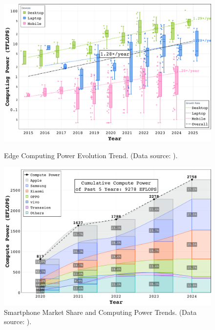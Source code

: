 \begin{figure}[htbp]
    \centering
    \begin{minipage}[t]{0.49\linewidth}
        \centering
        \includegraphics[width=\linewidth]{./figs/edge_compute_trend.pdf}
        \vspace{-20pt}
        \caption{Edge Computing Power Evolution Trend. (Data source: \cite{nanoreview2025}).}
        \label{fig:edge_trend}
    \end{minipage}
    \hfill
    \begin{minipage}[t]{0.49\linewidth}
        \centering
        \includegraphics[width=\linewidth]{./figs/smartphone_compute_trend.pdf}
        \vspace{-20pt}
        \caption{Smartphone Market Share and Computing Power Trends. (Data source: \cite{canalys2025}).}
        \label{fig:smartphone_trend}
    \end{minipage}
\end{figure}
